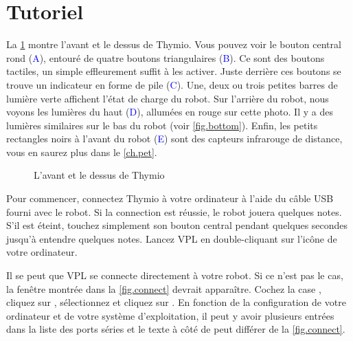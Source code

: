 \part{Tutoriel}
\label{ch.intro}


La \cref{fig.front} montre l'avant et le dessus de Thymio.
Vous pouvez voir le bouton central rond (\textcolor{blue}{A}), entouré de quatre boutons triangulaires (\textcolor{blue}{B}).
Ce sont des boutons tactiles, un simple effleurement suffit à les activer.
Juste derrière ces boutons se trouve un indicateur en forme de pile (\textcolor{blue}{C}).
Une, deux ou trois petites barres de lumière verte affichent l'état de charge du robot.
Sur l'arrière du robot, nous voyons les lumières du haut (\textcolor{blue}{D}), allumées en rouge sur cette photo.
Il y a des lumières similaires sur le bas du robot (voir \cref{fig.bottom}).
Enfin, les petits rectangles noirs à l'avant du robot (\textcolor{blue}{E}) sont des capteurs infrarouge de distance, vous en saurez plus dans le \cref{ch.pet}.

\begin{figure}[h]
\begin{center}
\caption{L'avant et le dessus de Thymio}\label{fig.front}
\end{center}
\end{figure} 


Pour commencer, connectez Thymio à votre ordinateur à l'aide du câble USB fourni avec le robot.
Si la connection est réussie, le robot jouera quelques notes.
S'il est éteint, touchez simplement son bouton central pendant quelques secondes jusqu'à entendre quelques notes.
Lancez VPL en double-cliquant sur l'icône  de votre ordinateur.



Il se peut que VPL se connecte directement à votre robot.
Si ce n'est pas le cas, la fenêtre montrée dans la \cref{fig.connect} devrait apparaître.
Cochez la case , cliquez sur , sélectionnez  et cliquez sur .
En fonction de la configuration de votre ordinateur et de votre système d'exploitation, il peut y avoir plusieurs entrées dans la liste des ports séries et le texte à côté de  peut différer de la \cref{fig.connect}.

